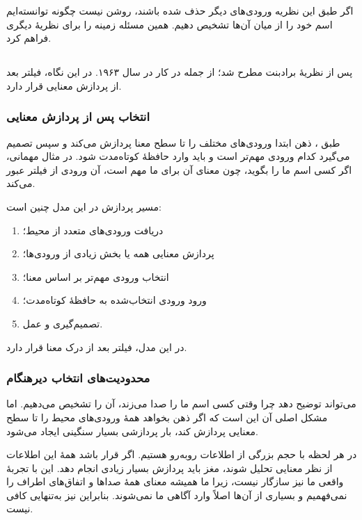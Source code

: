 اگر طبق این نظریه ورودی‌های دیگر حذف شده باشند، روشن نیست چگونه توانسته‌ایم اسم خود را از میان آن‌ها تشخیص دهیم. همین مسئله زمینه را برای نظریهٔ دیگری فراهم کرد.

\subsection{}
 پس از نظریهٔ برادبنت مطرح شد؛ از جمله در کار  در سال ۱۹۶۳. در این نگاه، فیلتر بعد از پردازش معنایی قرار دارد.

\subsubsection{انتخاب پس از پردازش معنایی}
طبق ، ذهن ابتدا ورودی‌های مختلف را تا سطح معنا پردازش می‌کند و سپس تصمیم می‌گیرد کدام ورودی مهم‌تر است و باید وارد حافظهٔ کوتاه‌مدت شود. در مثال مهمانی، اگر کسی اسم ما را بگوید، چون معنای آن برای ما مهم است، آن ورودی از فیلتر عبور می‌کند.

مسیر پردازش در این مدل چنین است:
\begin{enumerate}
    \item دریافت ورودی‌های متعدد از محیط؛
    \item پردازش معنایی همه یا بخش زیادی از ورودی‌ها؛
    \item انتخاب ورودی مهم‌تر بر اساس معنا؛
    \item ورود ورودی انتخاب‌شده به حافظهٔ کوتاه‌مدت؛
    \item تصمیم‌گیری و عمل.
\end{enumerate}

در این مدل، فیلتر بعد از درک معنا قرار دارد.

\subsubsection{محدودیت‌های انتخاب دیرهنگام}
 می‌تواند توضیح دهد چرا وقتی کسی اسم ما را صدا می‌زند، آن را تشخیص می‌دهیم. اما مشکل اصلی آن این است که اگر ذهن بخواهد همهٔ ورودی‌های محیط را تا سطح معنایی پردازش کند، بار پردازشی بسیار سنگینی ایجاد می‌شود.

در هر لحظه با حجم بزرگی از اطلاعات روبه‌رو هستیم. اگر قرار باشد همهٔ این اطلاعات از نظر معنایی تحلیل شوند، مغز باید پردازش بسیار زیادی انجام دهد. این با تجربهٔ واقعی ما نیز سازگار نیست، زیرا ما همیشه معنای همهٔ صداها و اتفاق‌های اطراف را نمی‌فهمیم و بسیاری از آن‌ها اصلاً وارد آگاهی ما نمی‌شوند. بنابراین  نیز به‌تنهایی کافی نیست.

